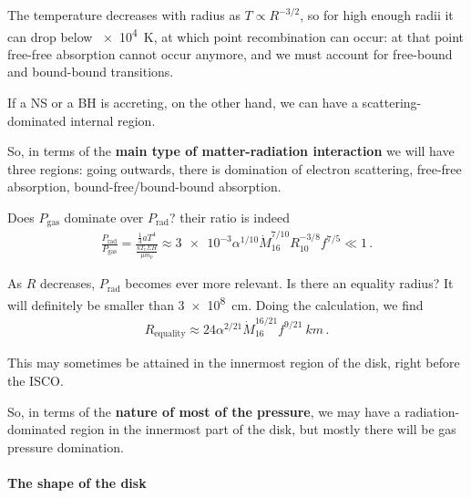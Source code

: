 \documentclass[main.tex]{subfiles}
\begin{document}
The temperature decreases with radius as \(T \propto R^{-3/2}\), so for high enough radii it can drop below \SI{e4}{K}, at which point recombination can occur: at that point free-free absorption cannot occur anymore, and we must account for free-bound and bound-bound transitions. 

If a NS or a BH is accreting, on the other hand, we can have a scattering-dominated internal region.

So, in terms of the \textbf{main type of matter-radiation interaction} we will have three regions: going outwards, there is domination of electron scattering, free-free absorption, bound-free/bound-bound absorption. 

Does \(P _{\text{gas}}\) dominate over \(P _{\text{rad}}\)? their ratio is indeed
%
\begin{align}
\frac{P _{\text{rad}}}{P _{\text{gas}}} = \frac{ \frac{1}{3} a T^{4}}{\frac{k T_c \Sigma H}{\mu m_p}} \approx \num{3e-3} \alpha^{1/10} \dot{M}_{16}^{7/10} R_{10}^{-3/8} f^{7/5} \ll 1
\,.
\end{align}

As \(R\) decreases, \(P _{\text{rad}}\) becomes ever more relevant. 
Is there an equality radius? It will definitely be smaller than \SI{3e8}{cm}. 
Doing the calculation, we find 
%
\begin{align}
R  _{\text{equality}} \approx \num{24} \alpha^{2/21} \dot{M}_{16}^{16/21} f^{9/21} \SI{}{km}
\,.
\end{align}

This may sometimes be attained in the innermost region of the disk, right before the ISCO.

So, in terms of the \textbf{nature of most of the pressure}, we may have a radiation-dominated region in the innermost part of the disk, but mostly there will be gas pressure domination. 

\paragraph{The shape of the disk}
\end{document}
